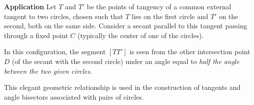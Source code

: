 \medskip
\noindent

\begin{tkzexample}[latex=.45\textwidth]

\begin{center}
\end{center}
\end{tkzexample}


\textbf{Application}
\medskip
\noindent
Let $T$ and $T'$ be the points of tangency of a common external tangent to two circles, chosen such that $T$ lies on the first circle and $T'$ on the second, both on the same side. Consider a secant parallel to this tangent passing through a fixed point $C$ (typically the center of one of the circles).

\medskip
\noindent
In this configuration, the segment $[TT']$ is seen from the other intersection point $D$ (of the secant with the second circle) under an angle equal to \emph{half the angle between the two given circles}.

\medskip
\noindent
This elegant geometric relationship is used in the construction of tangents and angle bisectors associated with pairs of circles.

\vspace{1em}


